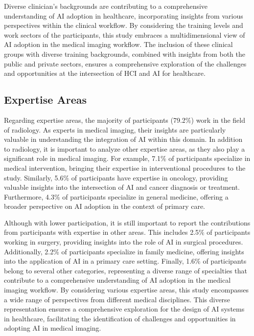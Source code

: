 Diverse clinician's backgrounds are contributing to a comprehensive understanding of \ac{AI} adoption in healthcare, incorporating insights from various perspectives within the clinical workflow.
By considering the training levels and work sectors of the participants, this study embraces a multidimensional view of \ac{AI} adoption in the medical imaging workflow.
The inclusion of these clinical groups with diverse training backgrounds, combined with insights from both the public and private sectors, ensures a comprehensive exploration of the challenges and opportunities at the intersection of \ac{HCI} and \ac{AI} for healthcare.

\subsection{Expertise Areas}
\label{chap:app002003003}

Regarding expertise areas, the majority of participants (79.2\%) work in the field of radiology.
As experts in medical imaging, their insights are particularly valuable in understanding the integration of \ac{AI} within this domain.
In addition to radiology, it is important to analyze other expertise areas, as they also play a significant role in medical imaging.
For example, 7.1\% of participants specialize in medical intervention, bringing their expertise in interventional procedures to the study.
Similarly, 5.6\% of participants have expertise in oncology, providing valuable insights into the intersection of \ac{AI} and cancer diagnosis or treatment.
Furthermore, 4.3\% of participants specialize in general medicine, offering a broader perspective on \ac{AI} adoption in the context of primary care.

Although with lower participation, it is still important to report the contributions from participants with expertise in other areas.
This includes 2.5\% of participants working in surgery, providing insights into the role of \ac{AI} in surgical procedures.
Additionally, 2.2\% of participants specialize in family medicine, offering insights into the application of AI in a primary care setting. Finally, 1.6\% of participants belong to several other categories, representing a diverse range of specialties that contribute to a comprehensive understanding of AI adoption in the medical imaging workflow.
By considering various expertise areas, this study encompasses a wide range of perspectives from different medical disciplines.
This diverse representation ensures a comprehensive exploration for the design of \ac{AI} systems in healthcare, facilitating the identification of challenges and opportunities in adopting \ac{AI} in medical imaging.

